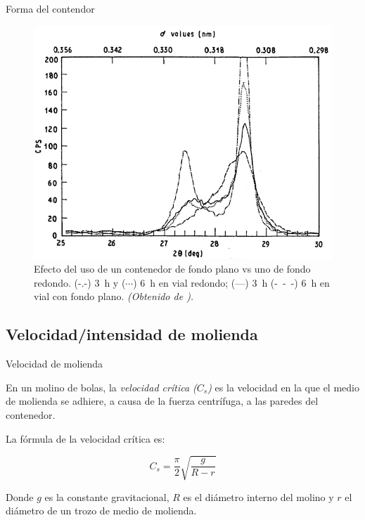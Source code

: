 \documentclass[%
spanish,
progressbar=head,
subsectionpage,
aspectratio=169
]{beamer}
\begin{document}
\begin{frame}{Forma del contendor}

    \begin{figure}
        \centering
        \includegraphics[height=0.7\pageheight,keepaspectratio]{figuras/efectoXRD-ed.png}
        \caption{\footnotesize Efecto del uso de un contenedor de fondo plano vs uno de fondo redondo. (-.-) \qty{3}{\hour} y (\(\cdots\)) \qty{6}{\hour} en vial redondo; (---) \qty{3}{\hour} (-\ -\ -) \qty{6}{\hour} en vial con fondo plano. \textit{(Obtenido de \cite{harringaEffectsVialShape1992}).}}
    \end{figure}
\end{frame}

\subsection{Velocidad/intensidad de molienda}

\begin{frame}{Velocidad de molienda}
    \begin{tcolorbox}[title={Velocidad crítica, \(C_s\):}]
        \small
        En un molino de bolas, la \emph{velocidad crítica (\(C_s\))} es la velocidad en la que el medio de molienda se adhiere, a causa de la fuerza centrífuga, a las paredes del contenedor.
        
        La fórmula de la velocidad crítica es:

        \begin{equation}
            C_s = \frac{\pi}{2}\sqrt{\frac{g}{R-r}}
        \end{equation}

        Donde \(g\) es la constante gravitacional, \(R\) es el diámetro interno del molino y \(r\) el diámetro de un trozo de medio de molienda. 
    \end{tcolorbox}
\end{frame}
\end{document}
